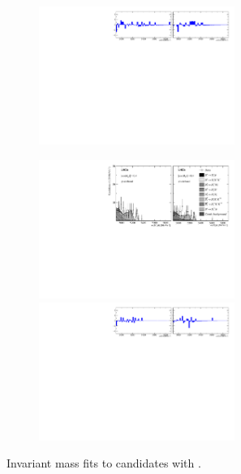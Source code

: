 \begin{figure}[!h]
\begin{subfigure}[t]{1.0\textwidth}
        \includegraphics[width=0.7\textwidth]{figs/Appendix_FitCategories/residuals_DsPhi_Ds2PhiPi_both_summed_splitHel_splitKKPi_s21_s21r1_s24_s26.pdf}
    \end{subfigure}
    \begin{subfigure}[t]{1.0\textwidth}
        \centering
        \includegraphics[width=0.7\textwidth]{figs/Appendix_FitCategories/canvas_DsPhiSide_Ds2PhiPi_both_summed_splitHel_splitKKPi_s21_s21r1_s24_s26.pdf}\\
        \includegraphics[width=0.7\textwidth]{figs/Appendix_FitCategories/residuals_DsPhiSide_Ds2PhiPi_both_summed_splitHel_splitKKPi_s21_s21r1_s24_s26.pdf}
    \end{subfigure}
    \caption{Invariant mass fits to \decay{\Bp}{\Dsp\phiz} candidates with \decay{\Dsp}{\phiz\pip}.}
\end{figure}

